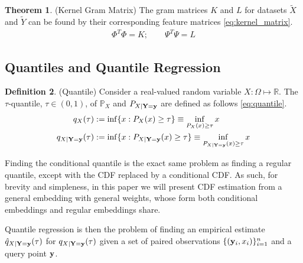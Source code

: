 \documentclass[twoside]{article} \usepackage{aistats2017}
\theoremstyle{definition}
\newtheorem{theorem}{Theorem}[section]
\newtheorem{definition}[theorem]{Definition}
\newcommand{\rv}[1]{{#1}}
\newcommand{\ds}[1]{\tilde{#1}}
\begin{document}
			\begin{theorem} \label{thm:kernel_matrix}
				(Kernel Gram Matrix)
				The gram matrices $K$ and $L$ for datasets $\ds{X}$ and $\ds{Y}$ can be found by their corresponding feature matrices \eqref{eq:kernel_matrix}.
				\begin{equation}
				\begin{aligned}
					\Phi^{T} \Phi = K ;\qquad \Psi^{T} \Psi = L
				\label{eq:kernel_matrix}
				\end{aligned}
				\end{equation}
			\end{theorem}
		
	\subsection{Quantiles and Quantile Regression}
	\label{sec:background:quantiles}

		\begin{definition} \label{def:quantile}
			(Quantile)
			Consider a real-valued random variable $\rv{X} : \Omega \mapsto \mathbb{R}$. The $\tau$-quantile, $\tau \in (0, 1)$, of $\mathbb{P}_{\rv{X}}$ and $P_{\rv{X} | \bvec{\rv{Y}} = \bvec{y}}$ are defined as follows \eqref{eq:quantile}.
			\begin{equation}
				\begin{aligned}
					q_{\rv{X}}(\tau) &:= \inf\{x : P_{\rv{X}}(x) \geq \tau\} \equiv \inf_{P_{\rv{X}}(x) \geq \tau} x \\
					q_{\rv{X} | \bvec{\rv{Y}} = \bvec{y}}(\tau) &:= \inf\{x : P_{\rv{X} | \bvec{\rv{Y}} = \bvec{y}}(x) \geq \tau\} \equiv \inf_{P_{\rv{X} | \bvec{\rv{Y}} = \bvec{y}}(x) \geq \tau} x
				\end{aligned}
			\label{eq:quantile}
			\end{equation}
		\end{definition}

		Finding the conditional quantile is the exact same problem as finding a regular quantile, except with the CDF replaced by a conditional CDF. As such, for brevity and simpleness, in this paper we will present CDF estimation from a general embedding with general weights, whose form both conditional embeddings and regular embeddings share.
		
		Quantile regression is then the problem of finding an empirical estimate $\hat{q}_{\rv{X} | \bvec{\rv{Y}} = \bvec{y}}(\tau)$ for $q_{\rv{X} | \bvec{\rv{Y}} = \bvec{y}}(\tau)$ given a set of paired observations $\{(\mathbf{y}_{i}, x_{i})\}_{i = 1}^{n}$ and a query point $\mathbf{y}$.
		
\end{document}
